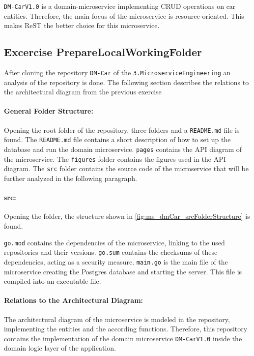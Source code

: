 \texttt{DM-CarV1.0} is a domain-microservice implementing CRUD operations on car entities.
Therefore, the main focus of the microservice is resource-oriented.
This makes ReST the better choice for this microservice.

\subsection{Excercise PrepareLocalWorkingFolder}
\label{subsec:prepare_local_working_folder}
After cloning the repository \texttt{DM-Car} of the \texttt{3.MicroserviceEngineering} an analysis of the repository is done.
The following section describes the relations to the architectural diagram from the previous exercise 

\paragraph*{General Folder Structure:}
Opening the root folder of the repository, three folders and a \texttt{README.md} file is found.
The \texttt{README.md} file contains a short description of how to set up the database and run the domain microservice.
\texttt{pages} contains the API diagram of the microservice.
The \texttt{figures} folder contains the figures used in the API diagram. 
The \texttt{src} folder contains the source code of the microservice that will be further analyzed in the following paragraph.

\paragraph*{src:}
Opening the folder, the structure shown in \autoref{fig:ms_dmCar_srcFolderStructure} is found.

\texttt{go.mod} contains the dependencies of the microservice, linking to the used repositories and their versions.
\texttt{go.sum} contains the checksums of these dependencies, acting as a security measure.
\texttt{main.go} is the main file of the microservice creating the Postgres database and starting the server.
This file is compiled into an executable file.

\paragraph*{Relations to the Architectural Diagram:}
The architectural diagram of the microservice is modeled in the repository, implementing the entities and the according functions.
Therefore, this repository contains the implementation of the domain microservice \texttt{DM-CarV1.0} inside the domain logic layer of the application.

